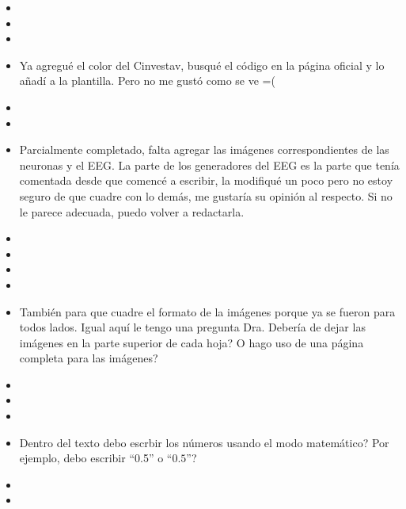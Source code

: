 %



\begin{itemize}
	\item {} 
	\item {}
	\item {}
	\item {} Ya agregué el color del Cinvestav, busqué el código en la página oficial y lo añadí a la plantilla. Pero no me gustó como se ve =(
	\item {}
	\item {}
	\item {} Parcialmente completado, falta agregar las imágenes correspondientes de las neuronas y el EEG. La parte de los generadores del EEG es la parte que tenía comentada desde que comencé a escribir, la modifiqué un poco pero no estoy seguro de que cuadre con lo demás, me gustaría su opinión al respecto. Si no le parece adecuada, puedo volver a redactarla.
	\item {}
	\item {}
	\item {}
	\item {}
	\item {} También para que cuadre el formato de la imágenes porque ya se fueron para todos lados. Igual aquí le tengo una pregunta Dra. Debería de dejar las imágenes en la parte superior de cada hoja? O hago uso de una página completa para las imágenes?
	\item {}
	\item {}
	\item {}
	\item {} Dentro del texto debo escrbir los números usando el modo matemático? Por ejemplo, debo escribir ``0.5'' o ``$0.5$''?
	\item {}
	\item {}
\end{itemize}
